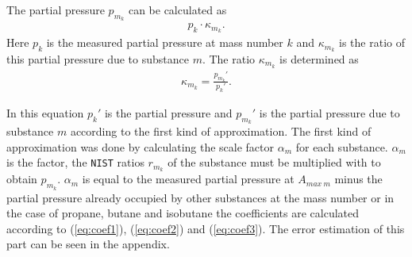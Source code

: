 The partial pressure $p_{m_k}$ can be calculated as 
\begin{align}
    p_k\cdot \kappa_{m_k}.
\end{align}
 Here $p_k$ is the measured partial pressure at mass number $k$ and $\kappa_{m_k}$ is the ratio of this partial pressure due to substance $m$. The ratio $\kappa_{m_k}$ is determined as 
 \begin{align}
     \kappa_{m_k} = \frac{p_{m_k}'}{p_{k}'}.
 \end{align}
 
In this equation $p_{k}'$ is the partial pressure and $p_{m_k}'$ is the partial pressure due to substance $m$ according to the first kind of approximation. The first kind of approximation was done by calculating the scale factor $\alpha_m$ for each substance. $\alpha_m$ is the factor, the \texttt{NIST} ratios $r_{m_k}$ of the substance must be multiplied with to obtain $p_{m_k}$. $\alpha_m$ is equal to the measured partial pressure at $A_{{max}~m}$ minus the partial pressure already occupied by other substances at the mass number or in the case of propane, butane and isobutane the coefficients are calculated according to (\ref{eq:coef1}), (\ref{eq:coef2}) and (\ref{eq:coef3}). The error estimation of this part can be seen in the appendix. 






